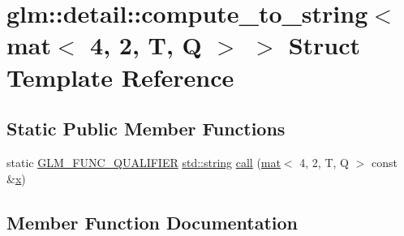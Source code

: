 \hypertarget{structglm_1_1detail_1_1compute__to__string_3_01mat_3_014_00_012_00_01_t_00_01_q_01_4_01_4}{}\section{glm\+:\+:detail\+:\+:compute\+\_\+to\+\_\+string$<$ mat$<$ 4, 2, T, Q $>$ $>$ Struct Template Reference}
\label{structglm_1_1detail_1_1compute__to__string_3_01mat_3_014_00_012_00_01_t_00_01_q_01_4_01_4}
\subsection*{Static Public Member Functions}
\begin{DoxyCompactItemize}
\item 
static \hyperlink{setup_8hpp_a33fdea6f91c5f834105f7415e2a64407}{G\+L\+M\+\_\+\+F\+U\+N\+C\+\_\+\+Q\+U\+A\+L\+I\+F\+I\+ER} \hyperlink{_s_d_l__opengl__glext_8h_ae84541b4f3d8e1ea24ec0f466a8c568b}{std\+::string} \hyperlink{structglm_1_1detail_1_1compute__to__string_3_01mat_3_014_00_012_00_01_t_00_01_q_01_4_01_4_af5b35e5a4cb38e51bcde9ae1eba1d126}{call} (\hyperlink{structglm_1_1mat}{mat}$<$ 4, 2, T, Q $>$ const \&\hyperlink{_s_d_l__opengl_8h_ad0e63d0edcdbd3d79554076bf309fd47}{x})
\end{DoxyCompactItemize}


\subsection{Member Function Documentation}
\mbox{\label{structglm_1_1detail_1_1compute__to__string_3_01mat_3_014_00_012_00_01_t_00_01_q_01_4_01_4_af5b35e5a4cb38e51bcde9ae1eba1d126}} 
